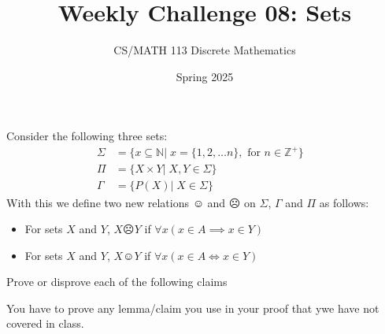 \documentclass[a4paper]{exam}
\title{Weekly Challenge 08: Sets}
\author{CS/MATH 113 Discrete Mathematics}
\date{Spring 2025}
\begin{document}
\maketitle

\begin{questions}
    Consider the following three sets:
    \begin{align*}
        \Sigma & = \{x \subseteq \mathbb{N} |\; x = \{1, 2,  \dots n\}, \text{ for } n \in \mathbb{Z}^+\}&\\
        \Pi & = \{ X \times Y|\; X,Y \in \Sigma\}&\\
        \Gamma & = \{P(X)|\; X \in \Sigma\}
    \end{align*}
    With this we define two new relations $\smiley$ and $\frownie$ on $\Sigma$, $\Gamma$ and $\Pi$  as follows:  
    \begin{itemize}  
        \item For sets $X$ and $Y$, $X \frownie Y$ if $\forall x (x\in A \implies x\in Y)$  
        \item For sets $X$ and $Y$, $X \smiley Y$ if $\forall x (x\in A \iff x\in Y)$  
    \end{itemize} 

    Prove or disprove each of the following claims
    You have to prove any lemma/claim you use in your proof that ywe have not covered in class.

\end{questions}
\end{document}

